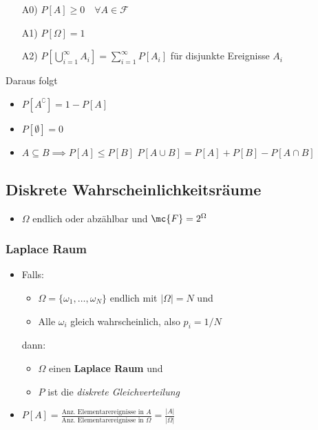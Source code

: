 \begin{itemize}
        \begin{itemize}
            \item[A0)] $P[A] \geq 0 \quad \forall A \in \mathcal{F}$
            \item[A1)] $P[\Omega] = 1$
            \item[A2)] $P\left[ \bigcup_{i=1}^\infty A_i \right] = \sum_{i=1}^\infty P[A_i]$ für disjunkte Ereignisse $A_i$
        \end{itemize}
        Daraus folgt
        \begin{itemize}
            \item $P[A^\complement] = 1 - P[A]$
            \item $P[\emptyset] = 0$
            \item $A \subseteq B \implies P[A] \leq P[B]$
             $P[A \cup B] = P[A] + P[B] - P[A\cap B]$
        \end{itemize}
\end{itemize}

\subsection{Diskrete Wahrscheinlichkeitsräume}
\begin{itemize}
    \item $\Omega$ endlich oder abzählbar und $\mc{F} = 2^\Omega$
\end{itemize}

\subsubsection{Laplace Raum}
\begin{itemize}
    \item Falls:
        \begin{itemize}
            \item $\Omega = \{\omega_1, \dots, \omega_N\}$ endlich mit $|\Omega| = N$ und
            \item Alle $\omega_i$ gleich wahrscheinlich, also $p_i = 1/N$
        \end{itemize}
    dann:
        \begin{itemize}
            \item $\Omega$ einen \textbf{Laplace Raum} und
            \item $P$ ist die \textit{diskrete Gleichverteilung}
        \end{itemize}
    \item $ P[A] = \frac{\mbox{Anz. Elementarereignisse in } A}{\mbox{Anz. Elementarereignisse in } \Omega} = \frac{|A|}{|\Omega|}$
\end{itemize}

